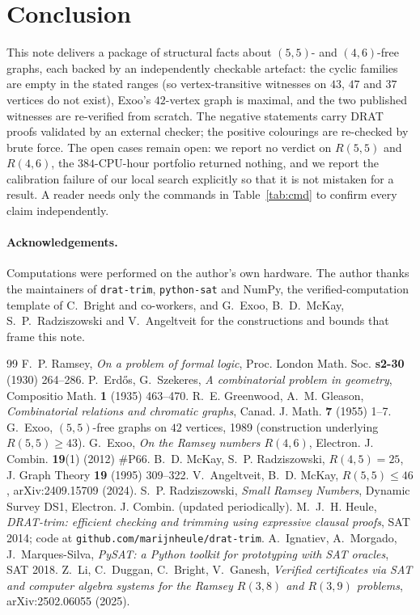 \documentclass[11pt]{article}
\theoremstyle{definition}
\theoremstyle{plain}
\newcommand{\R}[2]{\ensuremath{R(#1,#2)}}
\begin{document}
\section{Conclusion}

This note delivers a package of structural facts about $(5,5)$- and
$(4,6)$-free graphs, each backed by an independently checkable artefact: the
cyclic families are empty in the stated ranges (so vertex-transitive witnesses
on $43$, $47$ and $37$ vertices do not exist), Exoo's $42$-vertex graph is
maximal, and the two published witnesses are re-verified from scratch. The
negative statements carry DRAT proofs validated by an external checker; the
positive colourings are re-checked by brute force. The open cases remain open:
we report no verdict on $\R{5}{5}$ and $\R{4}{6}$, the $384$-CPU-hour portfolio
returned nothing, and we report the calibration failure of our local search
explicitly so that it is not mistaken for a result. A reader needs only the
commands in Table~\ref{tab:cmd} to confirm every claim independently.

\paragraph{Acknowledgements.}
Computations were performed on the author's own hardware. The author thanks
the maintainers of \texttt{drat-trim}, \texttt{python-sat} and NumPy, the
verified-computation template of C.~Bright and co-workers, and
G.~Exoo, B.~D.~McKay, S.~P.~Radziszowski and V.~Angeltveit for the
constructions and bounds that frame this note.

\begin{thebibliography}{99}
 F.~P. Ramsey, \emph{On a problem of formal logic},
Proc. London Math. Soc. \textbf{s2-30} (1930) 264--286.
 P.~Erd\H{o}s, G.~Szekeres, \emph{A combinatorial problem in
geometry}, Compositio Math. \textbf{1} (1935) 463--470.
 R.~E. Greenwood, A.~M. Gleason, \emph{Combinatorial
relations and chromatic graphs}, Canad. J. Math. \textbf{7} (1955) 1--7.
 G.~Exoo, $(5,5)$-free graphs on $42$ vertices, 1989
(construction underlying $\R{5}{5} \ge 43$).
 G.~Exoo, \emph{On the Ramsey numbers $R(4,6)$},
Electron. J. Combin. \textbf{19}(1) (2012) \#P66.
 B.~D. McKay, S.~P. Radziszowski, \emph{$R(4,5) = 25$},
J. Graph Theory \textbf{19} (1995) 309--322.
 V.~Angeltveit, B.~D. McKay, \emph{$R(5,5) \le 46$},
arXiv:2409.15709 (2024).
 S.~P. Radziszowski, \emph{Small Ramsey Numbers}, Dynamic Survey
DS1, Electron. J. Combin. (updated periodically).
 M.~J.~H. Heule, \emph{DRAT-trim: efficient checking and trimming
using expressive clausal proofs}, SAT 2014; code at
\texttt{github.com/marijnheule/drat-trim}.
 A.~Ignatiev, A.~Morgado, J.~Marques-Silva,
\emph{PySAT: a Python toolkit for prototyping with SAT oracles}, SAT 2018.
 Z.~Li, C.~Duggan, C.~Bright, V.~Ganesh,
\emph{Verified certificates via SAT and computer algebra systems for the
Ramsey $R(3,8)$ and $R(3,9)$ problems}, arXiv:2502.06055 (2025).
\end{thebibliography}
\end{document}
